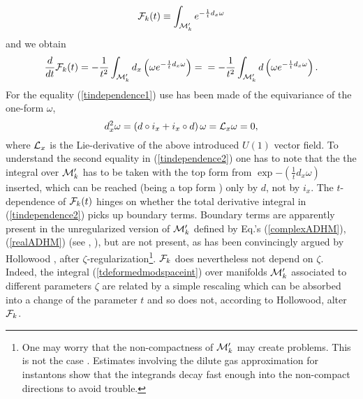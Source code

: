 \documentclass[a4paper,12pt]{article}
\begin{document}
\begin{equation}
{\cal F}_k(t) \equiv \int_{{\cal M}'_k} e^{-\frac{1}{t}d_x\omega} \label{tdeformedmodspaceint}
\end{equation}
and we obtain
\begin{equation}
\label{tindependence1}
\frac{d}{dt}{\cal F}_k(t) =-\frac{1}{t^2} \int_{{\cal M}'_k}d_x \left(\omega e^{-\frac{1}{t}d_x\omega}\right) = \\
\label{tindependence2}
 =-\frac{1}{t^2} \int_{{\cal M}'_k}d \left(\omega
 e^{-\frac{1}{t}d_x\omega}\right).
\label{tdeformedmodspaceint}
\end{equation}
For the equality (\ref{tindependence1}) use has been made of the equivariance of the one-form $\omega$,
\begin{equation}
d_x^2 \omega=\left(d \circ i_x+i_x \circ d\right)\omega={\cal L}_x
\omega=0,
\end{equation}
where ${\cal L}_x$ is the Lie-derivative of the above introduced
$U(1)$ vector field. To understand the second equality in
(\ref{tindependence2}) one has to note that the the integral over
${\cal M}'_k$ has to be taken with the top form from $\exp
{-(\frac{1}{t}d_x\omega )}$ inserted, which can be reached (being
a top form ) only by $d$, not by $i_x$. The $t$-dependence of
${\cal F}_k(t)$ hinges on whether the total derivative integral in
(\ref{tindependence2}) picks up boundary terms. Boundary terms are
apparently present in the unregularized version of ${\cal M}'_k$
defined by Eq.'s (\ref{complexADHM}), (\ref{realADHM}) (see
\cite{FPS1}, \cite{FPS2}), but are not present, as has been
convincingly argued by Hollowood \cite{H}, after
$\zeta$-regularization\footnote{One may worry that the
non-compactness of ${\cal M}'_k$ may create problems. This is not
the case . Estimates involving the dilute gas approximation for
instantons show that the integrands decay fast enough into the
non-compact directions to avoid trouble.}. ${\cal F}_k$ does
nevertheless not depend on $\zeta$. Indeed, the integral
(\ref{tdeformedmodspaceint}) over manifolds ${\cal M}'_k$
associated to different parameters $\zeta$ are related by a simple
rescaling which can be absorbed into a change of the parameter $t$
and so does not, according to Hollowood, alter ${\cal F}_k$.
\end{document}
